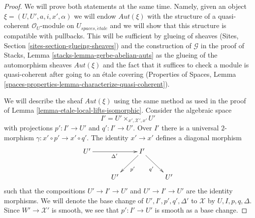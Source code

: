 \documentclass{stacks-project}
\theoremstyle{plain}
\theoremstyle{definition}
\theoremstyle{remark}
\numberwithin{equation}{subsection}
\def\etale{{\acute{e}tale}}
\begin{document}
\begin{proof}
We will prove both statements at the same time. Namely, given
an object $\xi = (U, U', a, i, x', \alpha)$ we will endow
$\mathit{Aut}(\xi)$ with the structure of a
quasi-coherent $\mathcal{O}_U$-module on $U_{spaces, \etale}$ and
we will show that this structure is compatible with pullbacks.
This will be sufficient by glueing of sheaves
(Sites, Section \ref{sites-section-glueing-sheaves})
and the construction of $\mathcal{G}$ in the proof of
Stacks, Lemma \ref{stacks-lemma-gerbe-abelian-auts}
as the glueing of the automorphism sheaves $\mathit{Aut}(\xi)$
and the fact that it suffices to check a module is
quasi-coherent after going to an \'etale covering
(Properties of Spaces, Lemma
\ref{spaces-properties-lemma-characterize-quasi-coherent}).

\medskip\noindent
We will describe the sheaf $\mathit{Aut}(\xi)$ using the
same method as used in the proof of
Lemma \ref{lemma-etale-local-lifts-isomorphic}.
Consider the algebraic space
$$
I' = U' \times_{x', \mathcal{X}', x'} U'
$$
with projections $p' : I' \to U'$ and $q' : I' \to U'$.
Over $I'$ there is a universal $2$-morphism
$\gamma : x' \circ p' \to x' \circ q'$.
The identity $x' \to x'$ defines a diagonal morphism
$$
\xymatrix{
U' \ar[rr]_{\Delta'} & & I' \ar[ld]^{p'} \ar[rd]_{q'} \\
& U' & & U'
}
$$
such that the compositions $U' \to I' \to U'$ and $U' \to I' \to U'$
are the identity morphisms. We will denote the base change of
$U', I', p', q', \Delta'$ to $\mathcal{X}$ by $U, I, p, q, \Delta$.
Since $W' \to \mathcal{X}'$ is smooth, we see that $p' : I' \to U'$
is smooth as a base change.


\end{proof}
\end{document}
